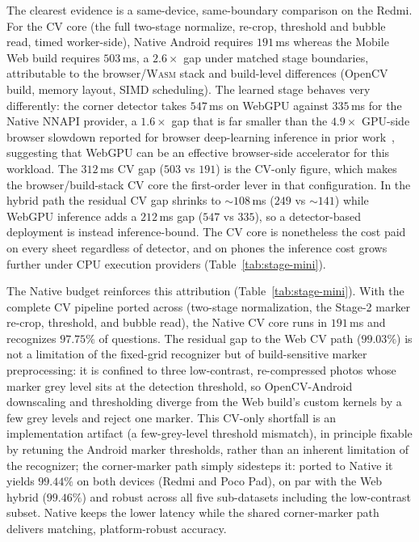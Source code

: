 \documentclass[conference]{IEEEtran}
\newcommand{\wasm}{\textnormal{\textsc{Wasm}}}
\begin{document}
The clearest evidence is a same-device, same-boundary comparison on the
Redmi. For the CV core (the full two-stage normalize, re-crop, threshold and
bubble read, timed worker-side), Native Android
requires $191$\,ms whereas the Mobile Web build requires $503$\,ms, a
$2.6\times$ gap under matched stage boundaries, attributable to the
browser/\wasm{} stack and build-level differences (OpenCV build, memory
layout, SIMD scheduling). The
learned stage behaves very differently: the corner detector takes
$547$\,ms on WebGPU against $335$\,ms for the Native NNAPI provider, a
$1.6\times$ gap that is far smaller than the $4.9\times$ GPU-side browser
slowdown reported for browser deep-learning inference in prior
work~\cite{wang2024}, suggesting that WebGPU can be an effective browser-side
accelerator for this workload. The $312$\,ms CV gap ($503$ vs $191$) is the CV-only figure, which makes the
browser/build-stack CV core the first-order lever in that configuration. In the
hybrid path the residual CV gap shrinks to ${\sim}108$\,ms ($249$ vs ${\sim}141$)
while WebGPU inference adds a $212$\,ms gap ($547$ vs $335$), so a detector-based
deployment is instead inference-bound. The CV core is nonetheless the cost paid
on every sheet regardless of detector, and on phones the inference cost grows
further under CPU execution providers (Table~\ref{tab:stage-mini}).



The Native budget reinforces this attribution
(Table~\ref{tab:stage-mini}). With the complete CV pipeline ported across
(two-stage normalization, the Stage-2 marker re-crop, threshold, and
bubble read), the Native CV core runs in $191$\,ms and recognizes
$97.75\%$ of questions. The residual gap to the Web CV path ($99.03\%$) is
not a limitation of the fixed-grid recognizer but of build-sensitive marker
preprocessing: it is confined to three low-contrast, re-compressed photos
whose marker grey level sits at the detection threshold, so OpenCV-Android
downscaling and thresholding diverge from the Web build's custom kernels by
a few grey levels and reject one marker. This CV-only shortfall is an implementation artifact (a few-grey-level threshold
mismatch), in principle fixable by retuning the Android marker thresholds, rather
than an inherent limitation of the recognizer; the corner-marker path simply
sidesteps it: ported to Native it yields $99.44\%$ on both devices (Redmi and
Poco Pad), on par with the Web hybrid ($99.46\%$) and robust across all five
sub-datasets including the low-contrast subset.
Native keeps the lower
latency while the shared corner-marker path delivers matching,
platform-robust accuracy.
\end{document}

